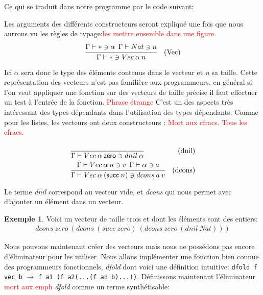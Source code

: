 \documentclass {article}
\newcommand{\codefrom}[3]
           {}
\theoremstyle{definition}
\newtheorem{example}{Exemple}
\theoremstyle{remark}
\newcommand{\todo}[1]{\textcolor{red}{#1}}
\newcommand{\fun}[1]{\lstinline!#1!}
\begin{document}
Ce qui se traduit dans notre programme par le code suivant:
\codefrom{dependent}{lambda}{terme_vector}
\codefrom{dependent}{lambda}{terme_dfold}



Les arguments des différents constructeurs seront expliqué une fois que nous aurrons vu les 
règles de typage:\todo{les mettre ensemble dans une figure.}
\begin{align*}
  &\cfrac{\Gamma\vdash * \ni \alpha\:\:\Gamma\vdash Nat \ni n}
  {\Gamma\vdash * \ni Vec\: \alpha\:n }&\mbox{(Vec)} \\
\end{align*}




Ici $\alpha$ sera donc le type des éléments contenus dans le vecteur et \emph{n} sa taille. 
Cette représentation des vecteurs n'est pas familière aux programmeurs, en général si l'on veut appliquer une fonction sur des vecteurs 
de taille précise il faut effectuer un test à l'entrée de la fonction. \todo{Phrase étrange} C'est un des aspects très intéressant des types dépendants dans 
l'utilisation des types dépendants. 
Comme pour les listes, les vecteurs ont deux constructeurs : \todo{Mort aux cfracs. Tous les cfracs.}
\begin{align*}
  &\cfrac{}
  {\Gamma\vdash Vec\:\alpha\:\zero \ni dnil\:\alpha}&\mbox{(dnil)} 
  \medskip\\
  &\cfrac{\Gamma\vdash Vec\:\alpha\:n\ni v \:\:\Gamma\vdash \alpha\ni a}
  {\Gamma\vdash Vec\:\alpha\:(\succs\:n)\ni dcons\:a\:v}&\mbox{(dcons)} \\
\end{align*}

Le terme \emph{dnil} correspond au vecteur vide, et \emph{dcons} qui nous permet avec d'ajouter un élément dans un vecteur.
\begin{example}
  Voici un vecteur de taille trois et dont les éléments sont des entiers:
  \begin{align*}
    dcons\:zero\:(dcons\:(succ\:zero)\:(dcons\:zero\:(dnil\:Nat)))
  \end{align*}  
\end{example}

Nous pouvons maintenant créer des vecteurs mais nous ne possédons pas encore d'éliminateur pour les utiliser. Nous allons 
implémenter une fonction bien connue des programmeurs fonctionnels, \emph{dfold} dont voici une définition intuitive:
\fun{dfold f vec b} $\rightarrow$ \fun{f a1 (f a2(...(f an b)...))}.
Définissons maintenant l'éliminateur \todo{mort aux emph} \emph{dfold} comme un terme synthétisable:
\end{document}
